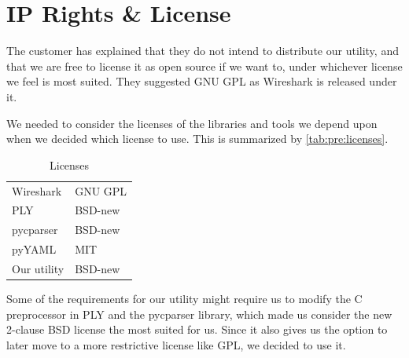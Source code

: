 \section{IP Rights \& License}
\label{sec:pre:license}
The customer has explained that they do not intend to distribute our utility,
and that we are free to license it as open source if we want to, under
whichever license we feel is most suited. They suggested GNU GPL as Wireshark
is released under it.

We needed to consider the licenses of the libraries and tools we depend upon
when we decided which license to use. This is summarized by
\autoref{tab:pre:licenses}.
\begin{table}[!h] \small \center
\vspace{-20pt}
\caption{Licenses\label{tab:pre:licenses}}
\begin{tabular}{l l}
	\toprule
	Wireshark & GNU GPL \\
	PLY & BSD-new \\
	pycparser & BSD-new \\
	pyYAML & MIT \\
	\midrule
	Our utility & BSD-new \\
	\bottomrule
\end{tabular}
\vspace{-10pt}
\end{table}

\noindent Some of the requirements for our utility might require us to modify
the C preprocessor in PLY and the pycparser library, which made us consider
the new 2-clause BSD license the most suited for us. Since it also gives us the
option to later move to a more restrictive license like GPL, we decided to use
it.
